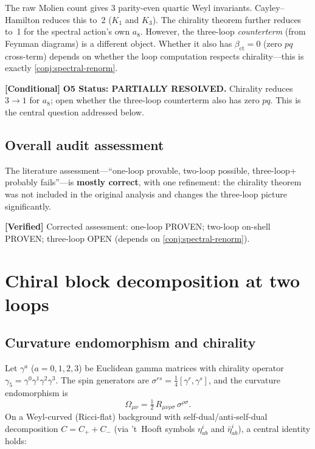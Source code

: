\documentclass[11pt,a4paper]{article}
\theoremstyle{definition}
\newcommand{\verified}[1]{%
  \par\smallskip\noindent
  \colorbox{green!10}{\parbox{\dimexpr\linewidth-2\fboxsep}{%
    \textcolor{proven}{\textbf{[Verified]}} #1}}%
  \par\smallskip}
\newcommand{\condbox}[1]{%
  \par\smallskip\noindent
  \colorbox{yellow!10}{\parbox{\dimexpr\linewidth-2\fboxsep}{%
    \textcolor{conditional}{\textbf{[Conditional]}} #1}}%
  \par\smallskip}
\begin{document}
The raw Molien count gives 3 parity-even quartic Weyl invariants.
Cayley--Hamilton reduces this to~2 ($K_1$ and $K_3$).  The chirality theorem
further reduces to~1 for the spectral action's own $a_8$.  However, the
three-loop \emph{counterterm} (from Feynman diagrams) is a different object.
Whether it also has $\beta_{\mathrm{ct}} = 0$ (zero $pq$ cross-term) depends
on whether the loop computation respects chirality---this is exactly
\cref{conj:spectral-renorm}.

\condbox{%
  \textbf{O5 Status: PARTIALLY RESOLVED.}
  Chirality reduces $3 \to 1$ for $a_8$; open whether the three-loop
  counterterm also has zero $pq$.  This is the central question addressed
  below.}

\subsection{Overall audit assessment}

The literature assessment---``one-loop provable, two-loop possible, three-loop+
probably fails''---is \textbf{mostly correct}, with one refinement: the
chirality theorem was not included in the original analysis and changes the
three-loop picture significantly.

\verified{%
  Corrected assessment: one-loop \textcolor{proven}{PROVEN}; two-loop on-shell
  \textcolor{proven}{PROVEN}; three-loop \textcolor{open}{OPEN} (depends on
  \cref{conj:spectral-renorm}).}


\section{Chiral block decomposition at two loops}\label{sec:chiral}

\subsection{Curvature endomorphism and chirality}

Let $\gamma^a$ ($a = 0,1,2,3$) be Euclidean gamma matrices with chirality
operator $\gamma_5 = \gamma^0\gamma^1\gamma^2\gamma^3$.  The spin generators
are $\sigma^{rs} = \tfrac{1}{4}[\gamma^r, \gamma^s]$, and the curvature
endomorphism is
\begin{equation}\label{eq:Omega}
  \Omega_{\mu\nu}
  = \tfrac{1}{2}\, R_{\mu\nu\rho\sigma}\, \sigma^{\rho\sigma}.
\end{equation}
On a Weyl-curved (Ricci-flat) background with self-dual/anti-self-dual
decomposition $C = C_+ + C_-$ (via 't~Hooft symbols $\eta^i_{ab}$ and
$\bar{\eta}^i_{ab}$), a central identity holds:
\end{document}
